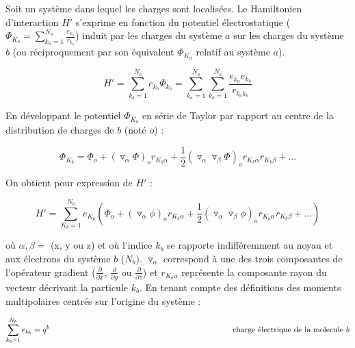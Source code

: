 \documentclass[12pt,a4paper]{book}
\begin{document}
	Soit un système dans lequel les charges sont localisées. Le Hamiltonien d'interaction $H'$ s'exprime en fonction du potentiel électrostatique ($\Phi_{K_{b}}= \sum_{k_{a}=1}^{N_{a}} \frac{e_{k_{a}}}{r_{k_{a}}}$) induit par les charges du système $a$ sur les charges du système $b$ (ou réciproquement par son équivalent $\Phi_{K_{a}}$ relatif au système $a$).
	
	\begin{equation}
	H' = \sum_{k_{b}=1}^{N_{b}} e_{k_{b}} \Phi_{k_{b}} = \sum_{k_{a}=1}^{N_{a}} \sum_{k_{b}=1}^{N_{b}} \frac{e_{k_{a}} e_{k_{b}}}{r_{k_{a}k_{b}}}
	\end{equation}
	
	En développant le potentiel $\Phi_{K_{b}}$ en série de Taylor par rapport au centre de la distribution de charges de $b$ (noté $o$) :
	
	\begin{equation}
	\Phi_{K_{b}} = \Phi_{o} + (\triangledown_{\alpha} \Phi)_{o} r_{K_{b}\alpha} + \frac{1}{2} (\triangledown_{\alpha} \triangledown_{\beta} \Phi)_{o} r_{K_{b}\alpha} r_{K_{b}\beta} + \ldots
	\end{equation}
	
	On obtient pour expression de $H'$ : 
	
	\begin{equation}
	H' = \sum_{K_{b}=1}^{N_{b}} e_{K_{b}} \left(\Phi_{o} + (\triangledown_{\alpha} \phi)_{o} r_{K_{b}\alpha} + \frac{1}{2}(\triangledown_{\alpha} \triangledown_{\beta}\phi)_{o} r_{K_{b}\alpha} r_{K_{b}\beta} + \ldots \right)
	\end{equation}
	
	\noindent où $\alpha,\beta=$ (x, y ou z) et où l'indice $k_{b}$ se rapporte indifféremment au noyau et aux électrons du système $b$ ($N_{b}$). $\triangledown_{\alpha}$ correspond à une des trois composantes de l'opérateur gradient ($\frac{\partial}{\partial x}$, $\frac{\partial}{\partial y}$ ou $\frac{\partial}{\partial z}$) et $r_{K_{b}\alpha}$ représente la composante rayon du vecteur décrivant la particule $k_{b}$. En tenant compte des définitions des moments multipolaires centrés sur l'origine du système : 
	
	\begin{flushleft}
		\begin{equation*}
		\sum_{k_{b}=1}^{N_{b}} e_{k_{b}} = q^{b} \hspace{8.1cm}\textup{charge électrique de la molecule $b$}     
		\end{equation*}
	\end{flushleft}
	
\end{document}
